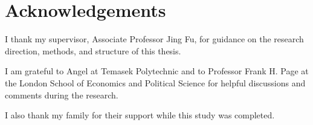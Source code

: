 \chapter*{Acknowledgements}

I thank my supervisor, Associate Professor Jing Fu, for guidance on the
research direction, methods, and structure of this thesis.

I am grateful to Angel at Temasek Polytechnic and to Professor Frank H. Page
at the London School of Economics and Political Science for helpful
discussions and comments during the research.

I also thank my family for their support while this study was completed.
